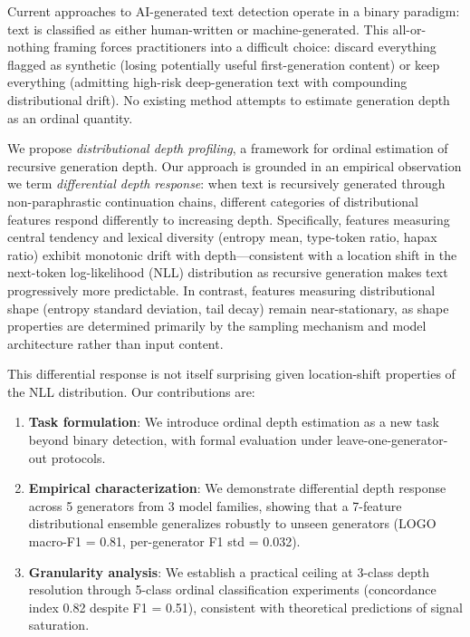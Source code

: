 \documentclass[11pt,a4paper]{article}
\begin{document}
Current approaches to AI-generated text detection operate in a binary paradigm: text is classified as either human-written or machine-generated. This all-or-nothing framing forces practitioners into a difficult choice: discard everything flagged as synthetic (losing potentially useful first-generation content) or keep everything (admitting high-risk deep-generation text with compounding distributional drift). No existing method attempts to estimate generation depth as an ordinal quantity.

We propose \emph{distributional depth profiling}, a framework for ordinal estimation of recursive generation depth. Our approach is grounded in an empirical observation we term \emph{differential depth response}: when text is recursively generated through non-paraphrastic continuation chains, different categories of distributional features respond differently to increasing depth. Specifically, features measuring central tendency and lexical diversity (entropy mean, type-token ratio, hapax ratio) exhibit monotonic drift with depth---consistent with a location shift in the next-token log-likelihood (NLL) distribution as recursive generation makes text progressively more predictable. In contrast, features measuring distributional shape (entropy standard deviation, tail decay) remain near-stationary, as shape properties are determined primarily by the sampling mechanism and model architecture rather than input content.

This differential response is not itself surprising given location-shift properties of the NLL distribution. Our contributions are:
\begin{enumerate}
    \item \textbf{Task formulation}: We introduce ordinal depth estimation as a new task beyond binary detection, with formal evaluation under leave-one-generator-out protocols.
    \item \textbf{Empirical characterization}: We demonstrate differential depth response across 5 generators from 3 model families, showing that a 7-feature distributional ensemble generalizes robustly to unseen generators (LOGO macro-F1 = 0.81, per-generator F1 std = 0.032).
    \item \textbf{Granularity analysis}: We establish a practical ceiling at 3-class depth resolution through 5-class ordinal classification experiments (concordance index 0.82 despite F1 = 0.51), consistent with theoretical predictions of signal saturation.
\end{enumerate}
\end{document}
